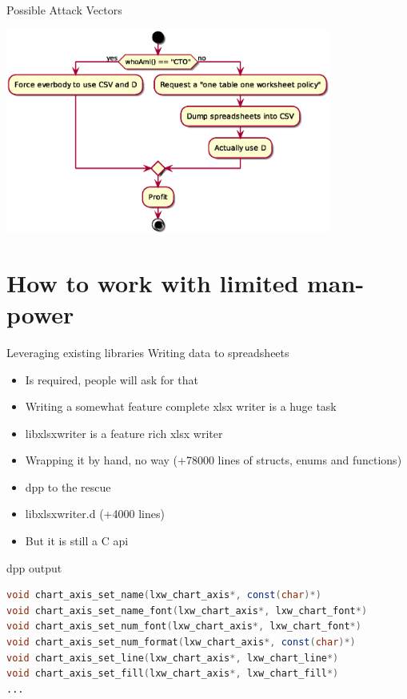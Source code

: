 \documentclass[aspectratio=169,notes]{beamer}
\begin{document}
	\begin{frame}{Possible Attack Vectors}
		\begin{center}
		\includegraphics[width=0.8\textwidth]{attackvectors.eps}
		\end{center}
	\end{frame}

	\section{How to work with limited man-power}

	\begin{frame}{Leveraging existing libraries}
		\large
		Writing data to spreadsheets
		\pause
		\begin{itemize}
			\item Is required, people will ask for that
			\item Writing a somewhat feature complete xlsx writer is a huge task\\[1cm]
		\end{itemize}
		\pause
		\begin{itemize}
			\item libxlsxwriter is a feature rich xlsx writer
			\item Wrapping it by hand, \pause no way (+78000 lines of structs, enums and functions)\\[1cm]
			\pause
			\item dpp to the rescue
			\item libxlsxwriter.d (+4000 lines)
			\item But it is still a C api
		\end{itemize}
	\end{frame}

	\begin{frame}[fragile]{dpp output}
		\begin{lstlisting}[language=D,basicstyle=\small\ttfamily]
void chart_axis_set_name(lxw_chart_axis*, const(char)*)
void chart_axis_set_name_font(lxw_chart_axis*, lxw_chart_font*)
void chart_axis_set_num_font(lxw_chart_axis*, lxw_chart_font*)
void chart_axis_set_num_format(lxw_chart_axis*, const(char)*)
void chart_axis_set_line(lxw_chart_axis*, lxw_chart_line*)
void chart_axis_set_fill(lxw_chart_axis*, lxw_chart_fill*)
...
\end{lstlisting}
	\end{frame}
\end{document}
